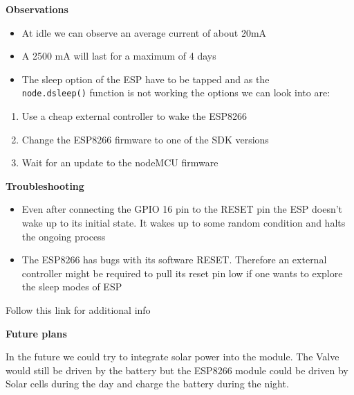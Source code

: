 \documentclass[16pt]{article}
\begin{document}
{\Large{\textbf{Observations}}}

\begin{itemize}

\item
  At idle we can observe an av\vspace{0.5cm}erage current of about 20mA
\item
  A 2500 mA will last for a maximum of 4 days
\item
  The sleep option of the ESP have to be tapped and as the \\
  \texttt{node.dsleep()} function is not working the options we can look
  into are:
\end{itemize}

\begin{enumerate}

\item
  Use a cheap external controller to wake the ESP8266
\item
  Change the ESP8266 firmware to one of the SDK versions
\item
  Wait for an update to the nodeMCU firmware
\end{enumerate}

\vspace{0.5cm}
\textbf{Troubleshooting}

\begin{itemize}
\item
  Even after connecting the GPIO 16 pin to the RESET pin the ESP doesn't
  wake up to its initial state. It wakes up to some random condition and
  halts the ongoing process
\item
  The ESP8266 has bugs with its software RESET. Therefore an external
  controller might be required to pull its reset pin low if one wants to
  explore the sleep modes of ESP
\end{itemize}

Follow this link for additional info

\vspace{0.5cm}
{\Large{\textbf{Future plans}}}

\vspace{0.3cm}
In the future we could try to integrate solar power into the module. The
Valve would still be driven by the battery but the ESP8266 module could
be driven by Solar cells during the day and charge the battery during
the night.

\vspace{0.3cm}
\end{document}
